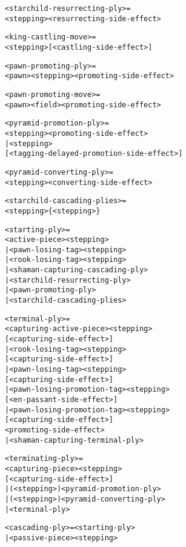 \begin{alltt}
<starchild-resurrecting-ply> =
  <stepping><resurrecting-side-effect>

<king-castling-move> =
  <stepping>[<castling-side-effect>]

<pawn-promoting-ply> =
  <pawn><stepping><promoting-side-effect>

<pawn-promoting-move> =
  <pawn><field><promoting-side-effect>

<pyramid-promotion-ply> =
  <stepping><promoting-side-effect>
| <stepping>
    [<tagging-delayed-promotion-side-effect>]

<pyramid-converting-ply> =
  <stepping><converting-side-effect>

<starchild-cascading-plies> =
  <stepping>\{<stepping>\}
\end{alltt}

\clearpage %

\begin{alltt}
<starting-ply> =
  <active-piece><stepping>
| <pawn-losing-tag><stepping>
| <rook-losing-tag><stepping>
| <shaman-capturing-cascading-ply>
| <starchild-resurrecting-ply>
| <pawn-promoting-ply>
| <starchild-cascading-plies>

<terminal-ply> =
  <capturing-active-piece><stepping>
    [<capturing-side-effect>]
| <rook-losing-tag><stepping>
    [<capturing-side-effect>]
| <pawn-losing-tag><stepping>
    [<capturing-side-effect>]
| <pawn-losing-promotion-tag><stepping>
    [<en-passant-side-effect>]
| <pawn-losing-promotion-tag><stepping>
    [<capturing-side-effect>]
    <promoting-side-effect>
| <shaman-capturing-terminal-ply>

<terminating-ply> =
  <capturing-piece><stepping>
    [<capturing-side-effect>]
| (<stepping>\alg{~})<pyramid-promotion-ply>
| (<stepping>\alg{~})<pyramid-converting-ply>
| <terminal-ply>

<cascading-ply> = <starting-ply>
                | <passive-piece><stepping>
\end{alltt}

\clearpage %

